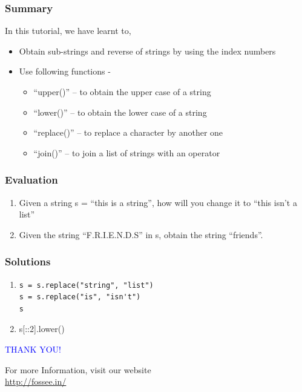 \documentclass[presentation]{beamer}
\begin{document}
\begin{frame}
\frametitle{Summary}
\label{sec-9}

  In this tutorial, we have learnt to, 


\begin{itemize}
\item Obtain sub-strings and reverse of strings by using the index numbers
\item Use following functions -
\begin{itemize}
\item ``upper()'' -- to obtain the upper case of a string
\item ``lower()'' -- to obtain the lower case of a string
\item ``replace()'' -- to replace a character by another one
\item ``join()'' -- to join a list of strings with an operator
\end{itemize}
\end{itemize}
\end{frame}
\begin{frame}
\frametitle{Evaluation}
\label{sec-10}


\begin{enumerate}
\item Given a string s = ``this is a string'', how will you change it
   to ``this isn't a list''
\vspace{12pt}   
\item Given the string ``F.R.I.E.N.D.S'' in s, obtain the string ``friends''.
\end{enumerate}
\end{frame}
\begin{frame}[fragile]
\frametitle{Solutions}
\label{sec-11}


\begin{enumerate}
\item \lstset{language=Python}
\begin{lstlisting}
s = s.replace("string", "list")
s = s.replace("is", "isn't")
s
\end{lstlisting}
\vspace{8pt}
\item s[::2].lower()
\end{enumerate}
\end{frame}
\begin{frame}

  \begin{block}{}
  \begin{center}
  \textcolor{blue}{\Large THANK YOU!} 
  \end{center}
  \end{block}
\begin{block}{}
  \begin{center}
    For more Information, visit our website\\
    \url{http://fossee.in/}
  \end{center}  
  \end{block}
\end{frame}
\end{document}

